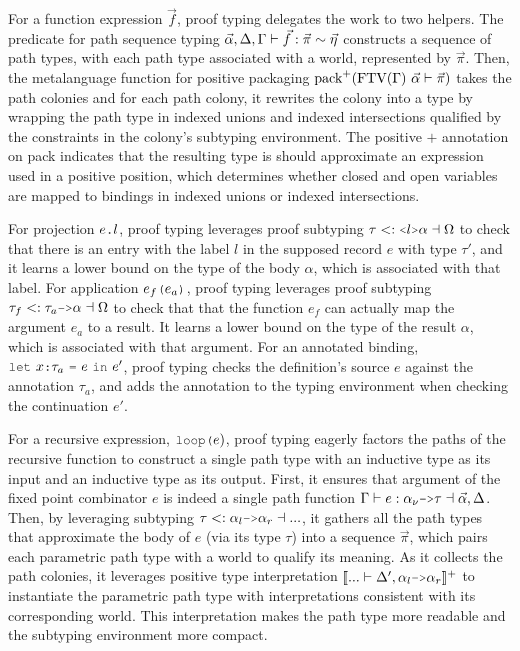 \documentclass[acmsmall]{acmart}
\theoremstyle{definition}
\begin{document}
For a function expression $\vec{f}$, proof typing 
delegates the work to two helpers. 
The predicate for path sequence typing 
$\vec{\alpha}, \Delta, \Gamma \vdash \vec{f} : \vec{\pi} \sim \vec{\eta}$
constructs a sequence of path types, 
with each path type associated with a world, represented by $\vec{\pi}$.
Then, the metalanguage function for positive packaging 
$\text{pack}^+(\text{FTV}(\Gamma)\ \vec{\alpha} \vdash \vec{\pi})$
takes the path colonies and for each path colony,
it rewrites the colony into a type by wrapping the path type in indexed unions
and indexed intersections qualified by the constraints in the colony's subtyping environment. 
The positive $+$ annotation on pack indicates that the resulting type 
is should approximate an expression used in a positive position,
which determines whether closed and open variables are mapped to
bindings in indexed unions or indexed intersections.

For projection $e\J{.}l$, proof typing
leverages proof subtyping $\tau \subtypes \J{<}l\J{>}\alpha \given \Omega$ 
to check that there is an entry with the label $l$ 
in the supposed record $e$ with type $\tau'$, 
and it learns a lower bound 
on the type of the body $\alpha$, which is associated with that label.
For application $e_f\J{(}e_a\J{)}$, proof typing
leverages proof subtyping $\tau_f \subtypes \tau_a \J{->} \alpha \given \Omega$
to check that that the function $e_f$ can actually
map the argument $e_a$ to a result. It learns a lower bound 
on the type of the result $\alpha$, which is associated with that argument.
For an annotated binding, $\J{let}\ x \J{:} \tau_a\ \J{=}\ e\ \J{in}\ e'$, 
proof typing checks the definition's source $e$ against the annotation $\tau_a$,
and adds the annotation to the typing environment when checking the continuation $e'$.

For a recursive expression, $\J{loop(}e{)}$, proof typing
eagerly factors the paths of the recursive function 
to construct a single path type with an inductive type as its input and an inductive type as its output. 
First, it ensures that argument of the fixed point combinator $e$ is indeed a 
single path function $\Gamma \entails e \hastype \alpha_\nu \J{->} \tau \given \vec{\alpha}, \Delta$. 
Then, by leveraging subtyping $\tau \subtypes \alpha_l \J{->} \alpha_r \given ...$, 
it gathers all the path types that approximate the body of $e$ (via its type $\tau$)
into a sequence $\vec{\pi}$, which pairs each parametric path type with a world to qualify its meaning.
As it collects the path colonies, it leverages positive type interpretation 
$\llbracket ... \entails \Delta', \alpha_l \J{->} \alpha_r \rrbracket^+$ 
to instantiate the parametric path type with interpretations consistent with its corresponding world. 
This interpretation makes the path type more readable and the subtyping environment more compact.
\end{document}
